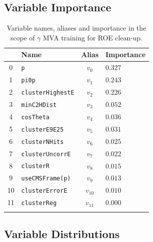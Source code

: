 \subsection{Variable Importance}

\begin{longtable}{c|l|c|l}
& Name & Alias & Importance \\
\toprule 
0 &\texttt{\footnotesize p} & $v_{0}$ & $0.327$ \\ 
1 &\texttt{\footnotesize pi0p} & $v_{1}$ & $0.243$ \\ 
2 &\texttt{\footnotesize clusterHighestE} & $v_{2}$ & $0.226$ \\ 
3 &\texttt{\footnotesize minC2HDist} & $v_{3}$ & $0.052$ \\ 
4 &\texttt{\footnotesize cosTheta} & $v_{4}$ & $0.036$ \\ 
5 &\texttt{\footnotesize clusterE9E25} & $v_{5}$ & $0.031$ \\ 
6 &\texttt{\footnotesize clusterNHits} & $v_{6}$ & $0.025$ \\ 
7 &\texttt{\footnotesize clusterUncorrE} & $v_{7}$ & $0.022$ \\ 
8 &\texttt{\footnotesize clusterR} & $v_{8}$ & $0.015$ \\ 
9 &\texttt{\footnotesize useCMSFrame(p)} & $v_{9}$ & $0.013$ \\ 
10 &\texttt{\footnotesize clusterErrorE} & $v_{10}$ & $0.010$ \\ 
11 &\texttt{\footnotesize clusterReg} & $v_{11}$ & $0.000$ \\ 
\bottomrule
\captionsetup{width=0.8\linewidth}
\caption{Variable names, aliases and importance in the scope of $\gamma$ MVA training for ROE clean-up.}
\end{longtable}


\subsection{Variable Distributions}

